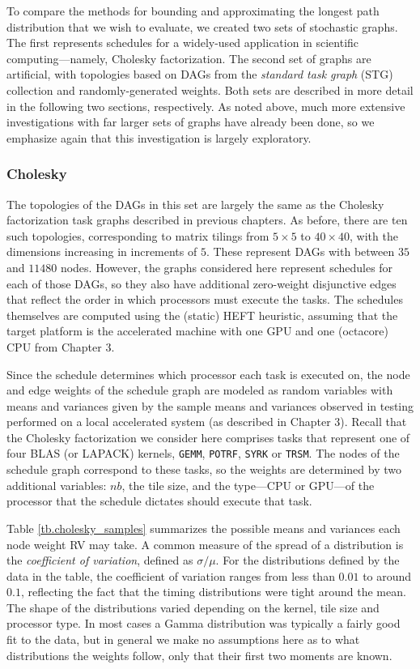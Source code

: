 \documentclass[12pt]{article}
\begin{document}
To compare the methods for bounding and approximating the longest path distribution that we wish to evaluate, we created two sets of stochastic graphs. The first represents schedules for a widely-used application in scientific computing---namely, Cholesky factorization. The second set of graphs are artificial, with topologies based on DAGs from the {\em standard task graph} (STG) collection \cite{tob02} and randomly-generated weights. Both sets are described in more detail in the following two sections, respectively. As noted above, much more extensive investigations with far larger sets of graphs have already been done, so we emphasize again that this investigation is largely exploratory.

\subsubsection{Cholesky}
\label{subsubsect.cholesky}

The topologies of the DAGs in this set are largely the same as the Cholesky factorization task graphs described in previous chapters. As before, there are ten such topologies, corresponding to matrix tilings from $5 \times 5$ to $40 \times 40$, with the dimensions increasing in increments of $5$. These represent DAGs with between $35$ and $11480$ nodes. However, the graphs considered here represent schedules for each of those DAGs, so they also have additional zero-weight disjunctive edges that reflect the order in which processors must execute the tasks. The schedules themselves are computed using the (static) HEFT heuristic, assuming that the target platform is the accelerated machine with one GPU and one (octacore) CPU from Chapter 3.

Since the schedule determines which processor each task is executed on, the node and edge weights of the schedule graph are modeled as random variables with means and variances given by the sample means and variances observed in testing performed on a local accelerated system (as described in Chapter 3). Recall that the Cholesky factorization we consider here comprises tasks that represent one of four BLAS (or LAPACK) kernels, {\tt GEMM}, {\tt POTRF}, {\tt SYRK} or {\tt TRSM}. The nodes of the schedule graph correspond to these tasks, so the weights are determined by two additional variables: $nb$, the tile size, and the type---CPU or GPU---of the processor that the schedule dictates should execute that task.

Table \ref{tb.cholesky_samples} summarizes the possible means and variances each node weight RV may take. A common measure of the spread of a distribution is the {\em coefficient of variation}, defined as $\sigma / \mu$. For the distributions defined by the data in the table, the coefficient of variation ranges from less than $0.01$ to around $0.1$, reflecting the fact that the timing distributions were tight around the mean. The shape of the distributions varied depending on the kernel, tile size and processor type. In most cases a Gamma distribution was typically a fairly good fit to the data, but in general we make no assumptions here as to what distributions the weights follow, only that their first two moments are known.           
\end{document}
